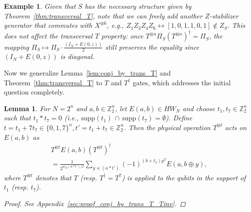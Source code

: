 \documentclass[twoside,romanappendices]{IEEEtran}
\newtheorem{lemma}[theorem]{Lemma}
\newtheorem{example}{Example}
\begin{document}
\begin{example}
Given that $S$ has the necessary structure given by Theorem~\ref{thm:transversal_T}, note that we can freely add another $Z$-stabilizer generator that commutes with $X^{\otimes 6}$, e.g., $Z_1 Z_3 Z_4 Z_6 \leftrightarrow [1,0,1,1,0,1] \notin Z_S$.
This does not affect the transversal $T$ property: once $T^{\otimes n} \Pi_S (T^{\otimes n})^{\dagger} = \Pi_S$, the mapping $\Pi_S \mapsto \Pi_S \cdot \frac{(I_N + E(0,z))}{2}$ still preserves the equality since $(I_N + E(0,z))$ is diagonal.
\end{example}

      

Now we generalize Lemma~\ref{lem:conj_by_trans_T} and Theorem~\ref{thm:transversal_T} to $T$ and $T^{\dagger}$ gates, which addresses the initial question completely.


\begin{lemma}
\label{lem:conj_by_trans_T_Tinv}
For $N = 2^n$ and $a,b \in \mathbb{Z}_2^n$, let $E(a,b) \in HW_N$ and choose $t_1, t_7 \in \mathbb{Z}_2^n$ such that $t_1 \ast t_7 = 0$ (i.e., $\text{supp}(t_1)\, \cap\, \text{supp}(t_7) = \emptyset$).
Define $t = t_1 + 7 t_7 \in \{0,1,7\}^n , t' = t_1 + t_7 \in \mathbb{Z}_2^n$.
Then the physical operation $T^{\otimes t}$ acts on $E(a,b)$ as
\begin{align}
& T^{\otimes t} E(a,b) \left( T^{\otimes t} \right)^{\dagger} \nonumber \\
%
  & = \frac{1}{2^{w_H(a \ast t')/2}} \sum_{y \preceq (a \ast t')} (-1)^{(b + t_7) y^T} E(a, b \oplus y),
\end{align}
where $T^{\otimes t}$ denotes that $T$ (resp. $T^{\dagger} = T^7$) is applied to the qubits in the support of $t_1$ (resp. $t_7$).
\begin{proof}
See Appendix~\ref{sec:proof_conj_by_trans_T_Tinv}.
\end{proof}
\end{lemma}
\end{document}
